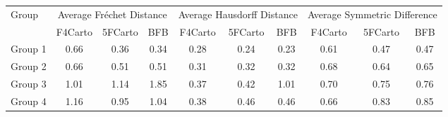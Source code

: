 
\begin{tabular}{lccc|ccc|ccc}
\toprule
\multirow{2}{*}{Group} & \multicolumn{3}{c}{Average Fréchet Distance} & \multicolumn{3}{c}{Average Hausdorff Distance} & \multicolumn{3}{c}{Average Symmetric Difference} \\
\cmidrule(lr){2-10}
                   & F4Carto & 5FCarto & BFB & F4Carto & 5FCarto & BFB & F4Carto & 5FCarto & BFB \\
\midrule

Group 1 &                      0.66 &                      0.36 &                         0.34 &                        0.28 &                        0.24 &                           0.23 &                          0.61 &                          0.47 &                             0.47 \\
Group 2 &                      0.66 &                      0.51 &                         0.51 &                        0.31 &                        0.32 &                           0.32 &                          0.68 &                          0.64 &                             0.65 \\
Group 3 &                      1.01 &                      1.14 &                         1.85 &                        0.37 &                        0.42 &                           1.01 &                          0.70 &                          0.75 &                             0.76 \\
Group 4 &                      1.16 &                      0.95 &                         1.04 &                        0.38 &                        0.46 &                           0.46 &                          0.66 &                          0.83 &                             0.85 \\
\bottomrule
\end{tabular}
